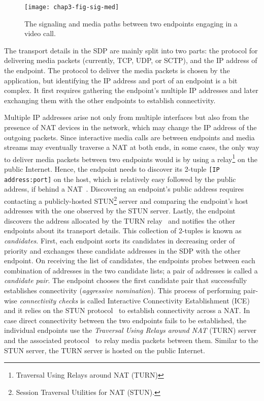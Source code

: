 \begin{figure}[!h]
\centerline{\texttt{[image: chap3-fig-sig-med]}}
\caption{The signaling and media paths between two endpoints engaging in
a video call.}
\label{fig:3:sig.media}
\end{figure}


The transport details in the SDP are mainly split into two parts: the protocol
for delivering media packets (currently, TCP, UDP, or SCTP), and the 
IP address of the endpoint. The protocol to deliver the media packets is
chosen by the application, but identifying the IP address and port of an
endpoint is a bit complex. It first requires gathering the endpoint's multiple
IP addresses and later exchanging them with the other endpoints to establish
connectivity.

Multiple IP addresses arise not only from multiple interfaces but also from
the presence of NAT devices in the network, which may change the IP address of
the outgoing packets. Since interactive media calls are between endpoints and
media streams may eventually traverse a NAT at both ends, in some cases, the
only way to deliver media packets between two endpoints would is by using
a relay\footnote{Traversal Using Relays around NAT (TURN)} on the public
Internet. Hence, the endpoint needs to discover its 2-tuple \texttt{[IP
address:port]} on the host, which is relatively easy followed by the public 
address, if behind a NAT~\cite{rfc5389}. Discovering an endpoint's public address
requires contacting a publicly-hosted STUN\footnote{Session Traversal
Utilities for NAT (STUN).} server and comparing the endpoint's
host addresses with the one observed by the STUN server. Lastly, the endpoint
discovers the address allocated by the TURN relay~\cite{rfc5766} and notifies
the other endpoints about its transport details. This collection of 2-tuples
is known as \emph{candidates}. First, each endpoint sorts its candidates
in decreasing order of priority and exchanges these candidate addresses in the
SDP with the other endpoint. On receiving the list of candidates, the endpoints
probes between each combination of addresses in the two candidate
lists; a pair of addresses is called a \emph{candidate pair}. The endpoint
chooses the first candidate pair that successfully establishes connectivity
(\emph{aggressive nomination}). This process of performing pair-wise
\emph{connectivity checks} is called Interactive Connectivity Establishment
(ICE)~\cite{rfc5245, rfc6544} and it relies on the STUN protocol~\cite{rfc5389} to establish connectivity
across a NAT. In case direct connectivity between the two endpoints fails 
to be established, the individual endpoints use the \emph{Traversal Using Relays
around NAT} (TURN) server and the associated protocol~\cite{rfc5766} to relay
media packets between them. Similar to the STUN server, the TURN
server is hosted on the public Internet.

